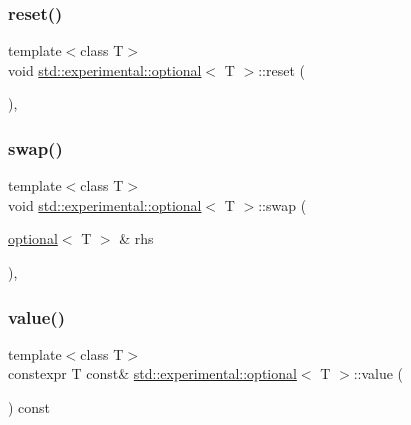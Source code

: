 \subsubsection{\texorpdfstring{reset()}{reset()}}
{\footnotesize\ttfamily template$<$class T$>$ \\
void \mbox{\hyperlink{classstd_1_1experimental_1_1optional}{std\+::experimental\+::optional}}$<$ T $>$\+::reset (\begin{DoxyParamCaption}{ }\end{DoxyParamCaption})\hspace{0.3cm}{\ttfamily [inline]}, {\ttfamily [noexcept]}}

\mbox{\label{classstd_1_1experimental_1_1optional_ad1173a269b43cd9ed55930c3eed0a4dd}} 
\subsubsection{\texorpdfstring{swap()}{swap()}}
{\footnotesize\ttfamily template$<$class T$>$ \\
void \mbox{\hyperlink{classstd_1_1experimental_1_1optional}{std\+::experimental\+::optional}}$<$ T $>$\+::swap (\begin{DoxyParamCaption}\item[{\mbox{\hyperlink{classstd_1_1experimental_1_1optional}{optional}}$<$ T $>$ \&}]{rhs }\end{DoxyParamCaption})\hspace{0.3cm}{\ttfamily [inline]}, {\ttfamily [noexcept]}}

\mbox{\label{classstd_1_1experimental_1_1optional_ad1277f09c288255dfe102b72e7107be6}} 
\subsubsection{\texorpdfstring{value()}{value()}\hspace{0.1cm}{\footnotesize\ttfamily [1/2]}}
{\footnotesize\ttfamily template$<$class T$>$ \\
constexpr T const\& \mbox{\hyperlink{classstd_1_1experimental_1_1optional}{std\+::experimental\+::optional}}$<$ T $>$\+::value (\begin{DoxyParamCaption}{ }\end{DoxyParamCaption}) const\hspace{0.3cm}{\ttfamily [inline]}}


